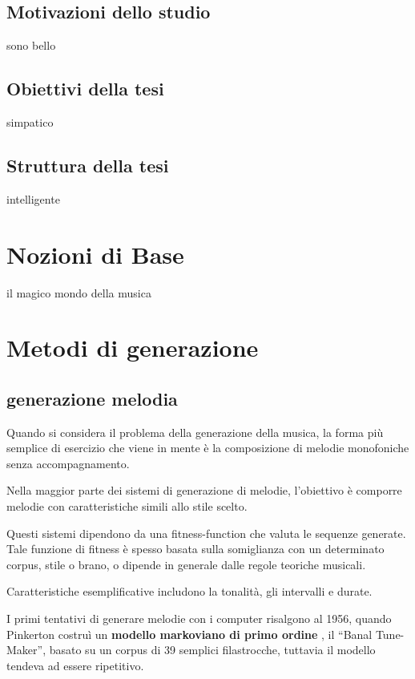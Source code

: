 \documentclass[a4paper,12pt]{report}
\begin{document}
\section{Motivazioni dello studio}

sono bello

\section{Obiettivi della tesi}

simpatico 

\section{Struttura della tesi}

intelligente

\chapter{Nozioni di Base}

il magico mondo della musica

\chapter{Metodi di generazione}

\section{generazione melodia}

Quando si considera il problema della generazione della musica, la forma più semplice di esercizio che viene in mente è la composizione di melodie monofoniche senza accompagnamento.

Nella maggior parte dei sistemi di generazione di melodie, l'obiettivo è comporre melodie con caratteristiche simili allo stile scelto.

Questi sistemi dipendono da una fitness-function che valuta le sequenze generate.
Tale funzione di fitness è spesso basata sulla somiglianza con un determinato corpus, stile o brano, o dipende in generale dalle regole teoriche musicali.

Caratteristiche esemplificative includono la tonalità, gli intervalli e durate.

I primi tentativi di generare melodie con i computer risalgono al 1956, quando Pinkerton costruì un \textbf{modello markoviano di primo ordine} , il “Banal Tune-Maker”, basato su un corpus di 39 semplici filastrocche,
tuttavia il modello tendeva ad essere ripetitivo.
\end{document}
